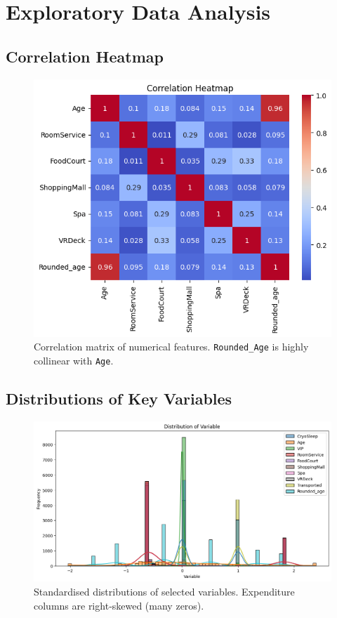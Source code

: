\documentclass[12pt]{article}
\begin{document}
\section{Exploratory Data Analysis}
\subsection{Correlation Heatmap}
\begin{figure}[H]
  \centering
  \includegraphics[width=0.6\linewidth]{output.png}
  \caption{Correlation matrix of numerical features.  \texttt{Rounded\_Age} is highly collinear with \texttt{Age}.}
\end{figure}
\subsection{Distributions of Key Variables}
\begin{figure}[H]
  \centering
  \includegraphics[width=0.9\linewidth]{output2.png}
  \caption{Standardised distributions of selected variables.  Expenditure columns are right‑skewed (many zeros).}
\end{figure}
\end{document}
